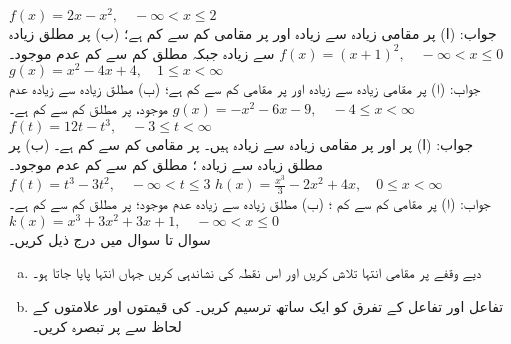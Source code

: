 $f(x)=2x-x^2,\quad -\infty<x\le 2$\\
جواب:\quad
(ا)  پر مقامی زیادہ سے زیادہ  اور  پر مقامی کم سے کم  ہے؛ (ب)  پر مطلق زیادہ سے زیادہ  جبکہ مطلق کم سے کم عدم موجود۔
$f(x)=(x+1)^2,\quad -\infty<x\le 0$
$g(x)=x^2-4x+4,\quad 1\le x<\infty$\\
جواب:\quad
(ا)  پر مقامی زیادہ سے زیادہ  اور  پر مقامی کم سے کم  ہے؛ (ب) مطلق زیادہ سے زیادہ عدم موجود،  پر مطلق کم سے کم  ہے۔
$g(x)=-x^2-6x-9,\quad -4\le x<\infty$
$f(t)=12t-t^3,\quad -3\le t<\infty$\\
جواب:\quad
(ا)  پر  اور  پر  مقامی زیادہ سے زیادہ ہیں۔  پر مقامی کم سے کم  ہے۔ (ب)  پر مطلق زیادہ سے زیادہ ؛ مطلق کم سے کم عدم موجود۔
$f(t)=t^3-3t^2,\quad -\infty<t\le 3$
$h(x)=\tfrac{x^3}{3}-2x^2+4x,\quad 0\le x<\infty$\\
جواب:\quad
(ا)  پر مقامی کم سے کم ؛ (ب) مطلق زیادہ سے زیادہ عدم موجود؛  پر مطلق کم سے کم  ہے۔
$k(x)=x^3+3x^2+3x+1,\quad -\infty<x\le 0$
\\
سوال  تا سوال  میں درج ذیل کریں۔
\begin{enumerate}[a.]
\item
دیے وقفے پر مقامی انتہا تلاش کریں اور  اس نقطہ کی نشاندہی کریں جہاں انتہا پایا جاتا ہو۔
\item
تفاعل اور تفاعل کے تفرق کو ایک ساتھ ترسیم کریں۔  کی قیمتوں اور علامتوں کے لحاظ سے  پر تبصرہ کریں۔
\end{enumerate}

